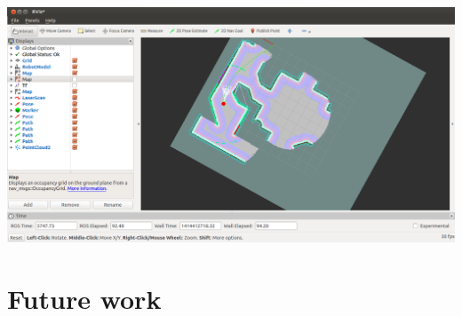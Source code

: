 \documentclass[a4paper]{article}
\begin{document}
\includegraphics[width=\textwidth,height=\textheight,keepaspectratio]{img/rviz_navigation2.png}

\section{Future work}
\end{document}
